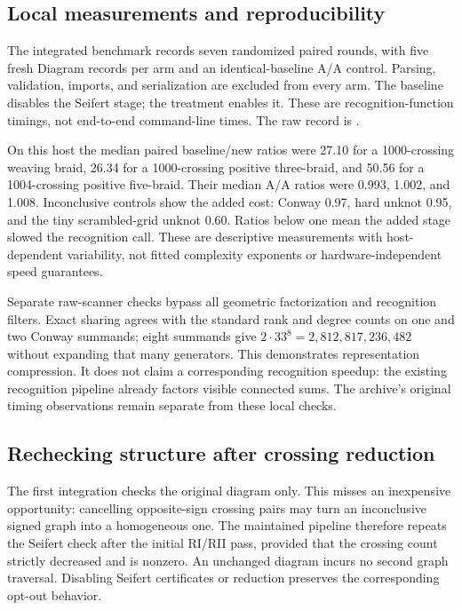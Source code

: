 \subsection{Local measurements and reproducibility}
The integrated benchmark  records
seven randomized paired rounds, with five fresh Diagram records per arm
and an identical-baseline A/A control. Parsing, validation, imports, and
serialization are excluded from every arm. The baseline disables the
Seifert stage; the treatment enables it. These are recognition-function
timings, not end-to-end command-line times. The raw record is
.

On this host the median paired baseline/new ratios were 27.10 for a
1000-crossing weaving braid, 26.34 for a 1000-crossing positive three-braid,
and 50.56 for a 1004-crossing positive five-braid. Their median A/A ratios
were 0.993, 1.002, and 1.008. Inconclusive controls show the added cost:
Conway 0.97, hard unknot 0.95, and the tiny scrambled-grid unknot 0.60.
Ratios below one mean the added stage slowed the recognition call.
These are descriptive measurements with host-dependent variability, not
fitted complexity exponents or hardware-independent speed guarantees.

Separate raw-scanner checks bypass all geometric factorization and
recognition filters. Exact sharing agrees with the standard rank and
degree counts on one and two Conway summands; eight summands give
$2\cdot33^8=2{,}812{,}817{,}236{,}482$ without expanding that many
generators. This demonstrates representation compression. It does not
claim a corresponding recognition speedup: the existing recognition
pipeline already factors visible connected sums. The archive's original
timing observations remain separate from these local checks.

\subsection{Rechecking structure after crossing reduction}
The first integration checks the original diagram only. This misses an
inexpensive opportunity: cancelling opposite-sign crossing pairs may turn
an inconclusive signed graph into a homogeneous one. The maintained
pipeline therefore repeats the Seifert check after the initial RI/RII
pass, provided that the crossing count strictly decreased and is nonzero.
An unchanged diagram incurs no second graph traversal. Disabling Seifert
certificates or reduction preserves the corresponding opt-out behavior.

